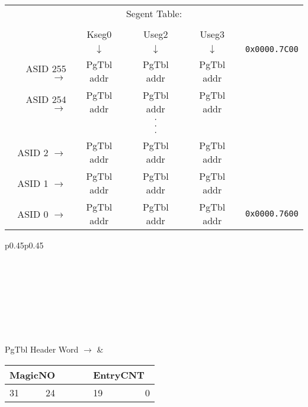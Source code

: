 {
\centering
\begin{tabular}{r|c|c|c|l}
\multicolumn{5}{c}{Segent Table:} \\
\multicolumn{5}{c}{}\\
\multicolumn{1}{c}{} & \multicolumn{1}{c}{Kseg0} & \multicolumn{1}{c}{Useg2} & \multicolumn{1}{c}{Useg3} & \multicolumn{1}{c}{} \\
\multicolumn{1}{c}{} & \multicolumn{1}{c}{$\downarrow$} & \multicolumn{1}{c}{$\downarrow$} & \multicolumn{1}{c}{$\downarrow$} & \multicolumn{1}{c}{\texttt{0x0000.7C00}} \\
\cline{2-4}
ASID 255 $\rightarrow$ & PgTbl addr & PgTbl addr & PgTbl addr & \\
\cline{2-4}
ASID 254 $\rightarrow$ & PgTbl addr & PgTbl addr & PgTbl addr & \\
\cline{2-4}
\multicolumn{1}{c}{} & \multicolumn{1}{c}{} & \multicolumn{1}{c}{$\cdot$} & \multicolumn{1}{c}{} & \multicolumn{1}{c}{} \\
\multicolumn{1}{c}{} & \multicolumn{1}{c}{} & \multicolumn{1}{c}{$\cdot$} & \multicolumn{1}{c}{} & \multicolumn{1}{c}{} \\
\multicolumn{1}{c}{} & \multicolumn{1}{c}{} & \multicolumn{1}{c}{$\cdot$} & \multicolumn{1}{c}{} & \multicolumn{1}{c}{} \\
\cline{2-4}
ASID 2 $\rightarrow$ & PgTbl addr & PgTbl addr & PgTbl addr & \\
\cline{2-4}
ASID 1 $\rightarrow$ & PgTbl addr & PgTbl addr & PgTbl addr & \\
\cline{2-4}
ASID 0 $\rightarrow$ & PgTbl addr & PgTbl addr & PgTbl addr & \texttt{0x0000.7600} \\
\cline{2-4}
\end{tabular}

\centering
\begin{tabular}{p{}p{}}
 \\
\\
\hline
{}\\
\hline
{}\\
\\
\\
\hline
{}\\
\hline
{}\\
\hline
{}\\
\hline
\hfill PgTbl Header Word $\rightarrow$ & 
	\begin{tabular}{lrclr}
	\multicolumn{2}{|c|}{MagicNO} & \cellcolor{gray}& \multicolumn{2}{|c|}{\hspace{14px}EntryCNT\hspace{11px}\ } \\
	\hline
	\footnotesize{31} & \footnotesize{24} & \ \ \ \ & \footnotesize{19} & \footnotesize{0} \\
	\end{tabular}
\end{tabular}
}